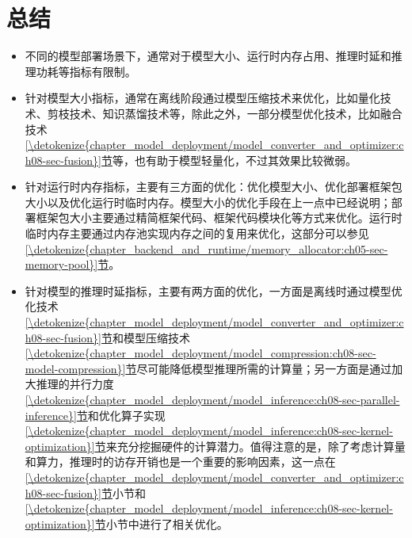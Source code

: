 \documentclass[letterpaper,10pt,english]{sphinxmanual}
\begin{document}
\section{总结}
\label{\detokenize{chapter_model_deployment/summary:id1}}\label{\detokenize{chapter_model_deployment/summary::doc}}\begin{itemize}
\item {} 
\sphinxAtStartPar
不同的模型部署场景下，通常对于模型大小、运行时内存占用、推理时延和推理功耗等指标有限制。

\item {} 
\sphinxAtStartPar
针对模型大小指标，通常在离线阶段通过模型压缩技术来优化，比如量化技术、剪枝技术、知识蒸馏技术等，除此之外，一部分模型优化技术，比如融合技术
\hyperref[\detokenize{chapter_model_deployment/model_converter_and_optimizer:ch08-sec-fusion}]{\ref{\detokenize{chapter_model_deployment/model_converter_and_optimizer:ch08-sec-fusion}}节}等，也有助于模型轻量化，不过其效果比较微弱。

\item {} 
\sphinxAtStartPar
针对运行时内存指标，主要有三方面的优化：优化模型大小、优化部署框架包大小以及优化运行时临时内存。模型大小的优化手段在上一点中已经说明；部署框架包大小主要通过精简框架代码、框架代码模块化等方式来优化。运行时临时内存主要通过内存池实现内存之间的复用来优化，这部分可以参见
\hyperref[\detokenize{chapter_backend_and_runtime/memory_allocator:ch05-sec-memory-pool}]{\ref{\detokenize{chapter_backend_and_runtime/memory_allocator:ch05-sec-memory-pool}}节}。

\item {} 
\sphinxAtStartPar
针对模型的推理时延指标，主要有两方面的优化，一方面是离线时通过模型优化技术
\hyperref[\detokenize{chapter_model_deployment/model_converter_and_optimizer:ch08-sec-fusion}]{\ref{\detokenize{chapter_model_deployment/model_converter_and_optimizer:ch08-sec-fusion}}节}和模型压缩技术
\hyperref[\detokenize{chapter_model_deployment/model_compression:ch08-sec-model-compression}]{\ref{\detokenize{chapter_model_deployment/model_compression:ch08-sec-model-compression}}节}尽可能降低模型推理所需的计算量；另一方面是通过加大推理的并行力度
\hyperref[\detokenize{chapter_model_deployment/model_inference:ch08-sec-parallel-inference}]{\ref{\detokenize{chapter_model_deployment/model_inference:ch08-sec-parallel-inference}}节}和优化算子实现
\hyperref[\detokenize{chapter_model_deployment/model_inference:ch08-sec-kernel-optimization}]{\ref{\detokenize{chapter_model_deployment/model_inference:ch08-sec-kernel-optimization}}节}来充分挖掘硬件的计算潜力。值得注意的是，除了考虑计算量和算力，推理时的访存开销也是一个重要的影响因素，这一点在
\hyperref[\detokenize{chapter_model_deployment/model_converter_and_optimizer:ch08-sec-fusion}]{\ref{\detokenize{chapter_model_deployment/model_converter_and_optimizer:ch08-sec-fusion}}节}小节和
\hyperref[\detokenize{chapter_model_deployment/model_inference:ch08-sec-kernel-optimization}]{\ref{\detokenize{chapter_model_deployment/model_inference:ch08-sec-kernel-optimization}}节}小节中进行了相关优化。


\end{itemize}
\end{document}
